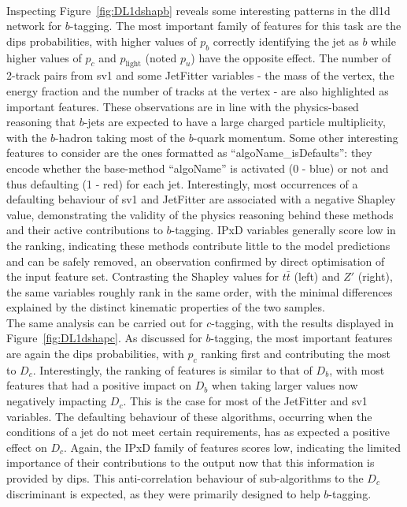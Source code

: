 \paragraph{}Inspecting Figure~\ref{fig:DL1dshapb} reveals some interesting patterns in the \gls{dl1d} network for $b$-tagging. The most important family of features for this task are the \gls{dips} probabilities, with higher values of $p_b$ correctly identifying the jet as $b$ while higher values of $p_c$ and $p_{\textrm{light}}$ (noted $p_u$) have the opposite effect. The number of 2-track pairs from \gls{sv1} and some JetFitter variables - the mass of the vertex, the energy fraction and the number of tracks at the vertex - are also highlighted as important features. These observations are in line with the physics-based reasoning that $b$-jets are expected to have a large charged particle multiplicity, with the $b$-hadron taking most of the $b$-quark momentum. Some other interesting features to consider are the ones formatted as  ``algoName\_isDefaults'': they encode whether the base-method ``algoName'' is activated (0 - blue) or not and thus defaulting (1 - red) for each jet. Interestingly, most occurrences of a defaulting behaviour of \gls{sv1} and JetFitter are associated with a negative Shapley value, demonstrating the validity of the physics reasoning behind these methods and their active contributions to $b$-tagging. IPxD variables generally score low in the ranking, indicating these methods contribute little to the model predictions and can be safely removed, an observation confirmed by direct optimisation of the input feature set. Contrasting the Shapley values for $t\bar{t}$ (left) and $Z'$ (right), the same variables roughly rank in the same order, with the minimal differences explained by the distinct kinematic properties of the two samples. \\

The same analysis can be carried out for $c$-tagging, with the results displayed in Figure~\ref{fig:DL1dshapc}. As discussed for $b$-tagging, the most important features are again the \gls{dips} probabilities, with $p_c$ ranking first and contributing the most to $D_c$. Interestingly, the ranking of features is similar to that of $D_b$, with most features that had a positive impact on $D_b$ when taking larger values now negatively impacting $D_c$. This is the case for most of the JetFitter and \gls{sv1} variables. The defaulting behaviour of these algorithms, occurring when the conditions of a jet do not meet certain requirements, has as expected a positive effect on $D_c$. Again, the IPxD family of features scores low, indicating the limited importance of their contributions to the output now that this information is provided by \gls{dips}. This anti-correlation behaviour of sub-algorithms to the $D_c$ discriminant is expected, as they were primarily designed to help $b$-tagging. 


